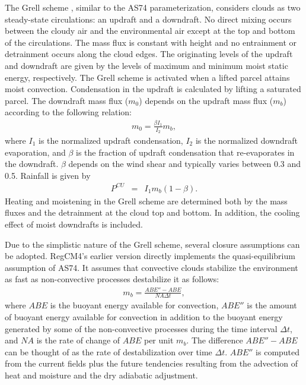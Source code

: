     The Grell scheme \cite{Grell_93}, similar
to the AS74 parameterization, considers clouds as two steady-state circulations:
an updraft and a downdraft. No direct mixing occurs between the cloudy air and
the environmental air except at the top and bottom of the circulations. The mass
flux is constant with height and no entrainment or detrainment occurs along the
cloud edges. The originating levels of the updraft and downdraft are given by
the levels of maximum and minimum moist static energy, respectively. The Grell
scheme is activated when a lifted parcel attains moist convection. Condensation
in the updraft is calculated by lifting a saturated parcel. The downdraft mass
flux ($m_0$) depends on the updraft mass flux ($m_b$) according to the following
relation: \begin{eqnarray} m_0=\frac{\beta I_1}{I_2}m_b, \end{eqnarray} where
$I_1$ is the normalized updraft condensation, $I_2$ is the normalized downdraft
evaporation, and $\beta$ is the fraction of updraft condensation that
re-evaporates in the downdraft. $\beta$ depends on the wind shear and typically
varies between 0.3 and 0.5. Rainfall is given by \begin{eqnarray}
P^{CU}&=&I_1m_b(1-\beta).  \label{eqn_model:GCCppt} \end{eqnarray} Heating and
moistening in the Grell scheme are determined both by the mass fluxes and the
detrainment at the cloud top and bottom. In addition, the cooling effect of
moist downdrafts is included.

Due to the simplistic nature of the Grell scheme, several closure assumptions
can be adopted. RegCM4's earlier version directly implements the
quasi-equilibrium assumption of AS74. It assumes that convective clouds
stabilize the environment as fast as non-convective processes destabilize it as
follows: \begin{eqnarray} m_b=\frac{ABE''-ABE}{NA\Delta t},
\label{eqn_model:closureAS} \end{eqnarray} where $ABE$ is the buoyant energy
available for convection, $ABE''$ is the amount of buoyant energy available for
convection in addition to the buoyant energy generated by some of the
non-convective processes during the time interval $\Delta t$, and $NA$ is the
rate of change of $ABE$ per unit $m_b$. The difference $ABE''-ABE$ can be
thought of as the rate of destabilization over time $\Delta t$. $ABE''$ is
computed from the current fields plus the future tendencies resulting from the
advection of heat and moisture and the dry adiabatic adjustment.

